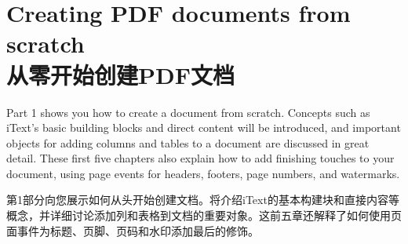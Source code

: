 \part{Creating PDF documents from scratch\\从零开始创建PDF文档}
Part 1 shows you how to create a document from scratch. Concepts such as iText’s basic building blocks and direct content will be introduced, and important objects for adding columns and tables to a document are discussed in great detail. These first five chapters also explain how to add finishing touches to your document, using page events for headers, footers, page numbers, and watermarks.

第1部分向您展示如何从头开始创建文档。将介绍iText的基本构建块和直接内容等概念，并详细讨论添加列和表格到文档的重要对象。这前五章还解释了如何使用页面事件为标题、页脚、页码和水印添加最后的修饰。